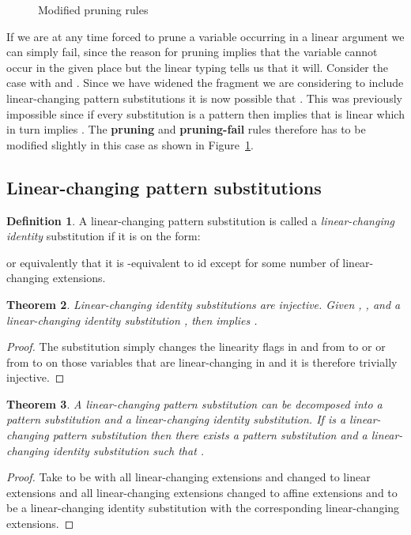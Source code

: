 \documentclass{eptcs}
\newcommand\fI{\textup{}}
\newcommand\fA{\textup{}}
\newcommand\fL{\textup{}}
\newtheorem{thm}{Theorem}[section]
\theoremstyle{definition}
\newtheorem{defin}[thm]{Definition}
\begin{document}
\begin{figure}

\caption{Modified pruning rules\label{fig:pat-unif-pruning}}
\end{figure} 

If we are at any time forced to prune a variable occurring in a
linear argument we can simply fail, since the reason for pruning implies
that the variable cannot occur in the given place but
the linear typing tells us that it will.
Consider the case  with  and .  Since
we have widened the fragment we are considering to include
linear-changing pattern substitutions it is now possible that
.  This was previously impossible since if
every substitution is a pattern then  implies
that  is linear which in turn implies .
The \textbf{pruning} and \textbf{pruning-fail}
rules therefore has to be modified slightly in this case as shown in
Figure~\ref{fig:pat-unif-pruning}.

\subsection{Linear-changing pattern substitutions}
\begin{defin}
A linear-changing pattern substitution  is called a
\emph{linear-changing identity} substitution if it is on the form:

or equivalently that it is -equivalent to \textsf{id} except for
some number of linear-changing extensions.
\end{defin}

\begin{thm}\label{thm:injective}
Linear-changing identity substitutions are injective.
Given , , and a linear-changing identity substitution ,
then  implies .
\end{thm}
\begin{proof}
The substitution  simply changes the linearity flags in  and  from
\fL{} to \fA{} or \fI{} or from \fA{} to \fI{} on
those variables that are linear-changing in
 and it is therefore trivially injective.
\end{proof}

\begin{thm}\label{thm:decompose}
A linear-changing pattern substitution can be decomposed into a pattern
substitution and a linear-changing identity substitution.
If  is a linear-changing pattern substitution then there exists a
pattern substitution  and a linear-changing identity substitution
 such that .
\end{thm}
\begin{proof}
Take  to be  with all linear-changing extensions  and
 changed to
linear extensions and all linear-changing extensions  changed to
affine extensions and  to be a linear-changing identity substitution
with the corresponding linear-changing extensions.
\end{proof}
\end{document}
